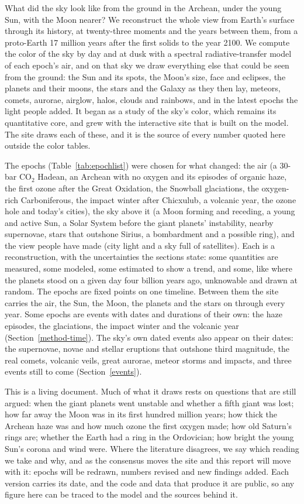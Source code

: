 \documentclass[9pt,twocolumn]{extarticle}
\begin{document}
What did the sky look like from the ground in the Archean, under the young Sun, with the Moon nearer? We reconstruct the whole view from Earth's surface through its history, at twenty-three moments and the years between them, from a proto-Earth 17 million years after the first solids to the year 2100. We compute the color of the sky by day and at dusk with a spectral radiative-transfer model of each epoch's air, and on that sky we draw everything else that could be seen from the ground: the Sun and its spots, the Moon's size, face and eclipses, the planets and their moons, the stars and the Galaxy as they then lay, meteors, comets, aurorae, airglow, halos, clouds and rainbows, and in the latest epochs the light people added. It began as a study of the sky's color, which remains its quantitative core, and grew with the interactive site that is built on the model. The site draws each of these, and it is the source of every number quoted here outside the color tables.

The epochs (Table~\ref{tab:epochlist}) were chosen for what changed: the air (a 30-bar CO$_2$ Hadean, an Archean with no oxygen and its episodes of organic haze, the first ozone after the Great Oxidation, the Snowball glaciations, the oxygen-rich Carboniferous, the impact winter after Chicxulub, a volcanic year, the ozone hole and today's cities), the sky above it (a Moon forming and receding, a young and active Sun, a Solar System before the giant planets' instability, nearby supernovae, stars that outshone Sirius, a bombardment and a possible ring), and the view people have made (city light and a sky full of satellites). Each is a reconstruction, with the uncertainties the sections state: some quantities are measured, some modeled, some estimated to show a trend, and some, like where the planets stood on a given day four billion years ago, unknowable and drawn at random. The epochs are fixed points on one timeline. Between them the site carries the air, the Sun, the Moon, the planets and the stars on through every year. Some epochs are events with dates and durations of their own: the haze episodes, the glaciations, the impact winter and the volcanic year (Section~\ref{method-time}). The sky's own dated events also appear on their dates: the supernovae, novae and stellar eruptions that outshone third magnitude, the real comets, volcanic veils, great aurorae, meteor storms and impacts, and three events still to come (Section~\ref{events}).

This is a living document. Much of what it draws rests on questions that are still argued: when the giant planets went unstable and whether a fifth giant was lost; how far away the Moon was in its first hundred million years; how thick the Archean haze was and how much ozone the first oxygen made; how old Saturn's rings are; whether the Earth had a ring in the Ordovician; how bright the young Sun's corona and wind were. Where the literature disagrees, we say which reading we take and why, and as the consensus moves the site and this report will move with it: epochs will be redrawn, numbers revised and new findings added. Each version carries its date, and the code and data that produce it are public, so any figure here can be traced to the model and the sources behind it.
\end{document}
